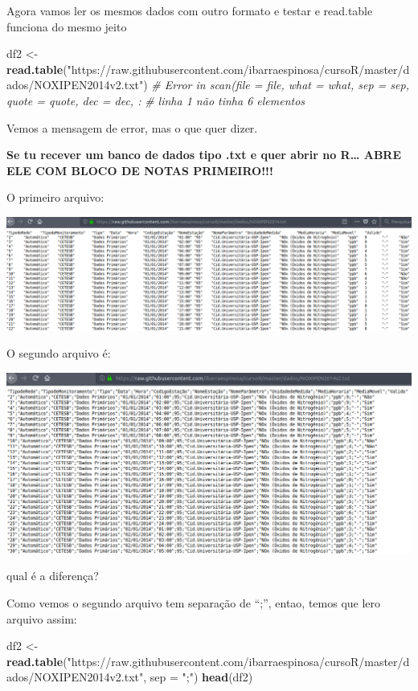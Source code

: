 \documentclass[]{book}
\newenvironment{Shaded}{\begin{snugshade}}{\end{snugshade}}
\newcommand{\KeywordTok}[1]{\textcolor[rgb]{0.13,0.29,0.53}{\textbf{#1}}}
\newcommand{\DataTypeTok}[1]{\textcolor[rgb]{0.13,0.29,0.53}{#1}}
\newcommand{\StringTok}[1]{\textcolor[rgb]{0.31,0.60,0.02}{#1}}
\newcommand{\CommentTok}[1]{\textcolor[rgb]{0.56,0.35,0.01}{\textit{#1}}}
\newcommand{\NormalTok}[1]{#1}
\theoremstyle{definition}
\theoremstyle{definition}
\theoremstyle{definition}
\theoremstyle{remark}
\begin{document}
Agora vamos ler os mesmos dados com outro formato e testar e read.table
funciona do mesmo jeito

\begin{Shaded}
\begin{Highlighting}[]
\NormalTok{df2 <-}\StringTok{ }\KeywordTok{read.table}\NormalTok{(}\StringTok{"https://raw.githubusercontent.com/ibarraespinosa/cursoR/master/dados/NOXIPEN2014v2.txt"}\NormalTok{)}
\CommentTok{# Error in scan(file = file, what = what, sep = sep, quote = quote, dec = dec, : }
\CommentTok{# linha 1 não tinha 6 elementos}
\end{Highlighting}
\end{Shaded}

Vemos a mensagem de error, mas o que quer dizer.

\textbf{Se tu recever um banco de dados tipo .txt e quer abrir no
R\ldots{} ABRE ELE COM BLOCO DE NOTAS PRIMEIRO!!!}

O primeiro arquivo:

\includegraphics[width=18.47in]{figuras/f1}

O segundo arquivo é:

\includegraphics[width=15.33in]{figuras/f2}

qual é a diferença?

Como vemos o segundo arquivo tem separação de ``;'', entao, temos que
lero arquivo assim:

\begin{Shaded}
\begin{Highlighting}[]
\NormalTok{df2 <-}\StringTok{ }\KeywordTok{read.table}\NormalTok{(}\StringTok{"https://raw.githubusercontent.com/ibarraespinosa/cursoR/master/dados/NOXIPEN2014v2.txt"}\NormalTok{, }\DataTypeTok{sep =} \StringTok{";"}\NormalTok{)}
\KeywordTok{head}\NormalTok{(df2)}
\end{Highlighting}
\end{Shaded}
\end{document}
